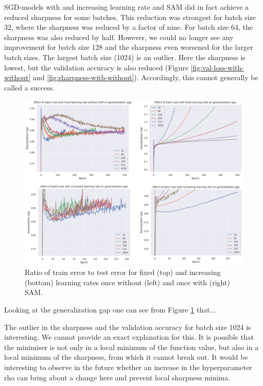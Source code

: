 \documentclass[10pt,conference,compsocconf]{IEEEtran}
\begin{document}
SGD-models with and increasing learning rate and SAM did in fact achieve a reduced sharpness for some batches. This reduction was strongest for batch size 32, where the sharpness was reduced by a factor of nine. For batch size 64, the sharpness was also reduced by half. However, we could no longer see any improvement for batch size 128 and the sharpness even worsened for the larger batch sizes. The largest batch size (1024) is an outlier. Here the sharpness is lowest, but the validation accuracy is also reduced (Figure \ref{fig:val-loss-with-without} and \ref{fig:sharpness-with-without}). Accordingly, this cannot generally be called a success.

\begin{figure}[tbp]
  \centering
  \includegraphics[width=\columnwidth]{img/figure5_gen_gap}
  \caption{Ratio of train error to test error for fixed (top) and increasing (bottom) learning rates once without (left) and once with (right) SAM.}
  \vspace{-3mm}
  \label{fig:gen-gap}
\end{figure}

Looking at the generalization gap one can see from Figure \ref{fig:gen-gap} that...

The outlier in the sharpness and the validation accuracy for batch size 1024 is interesting. We cannot provide an exact explanation for this. It is possible that the minimiser is not only in a local minimum of the function value, but also in a local minimum of the sharpness, from which it cannot break out. It would be interesting to observe in the future whether an increase in the hyperparameter rho can bring about a change here and prevent local sharpness minima. 
\end{document}
